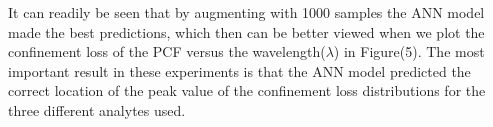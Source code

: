 \documentclass[draft, 10pt]{IEEEtran}
\begin{document}
\begin{figure}[h]
\begin{subfigure}{.5\textwidth}
\end{subfigure}
\caption{}
\end{figure}
\newpage
It can readily be seen that by augmenting with 1000 samples the ANN model made the best predictions, which then can be better viewed when we plot the confinement loss of the PCF versus the wavelength($\lambda$) in Figure(5).
The most important result in these experiments is that the ANN model predicted the correct location of the peak value of the confinement loss distributions for the three different analytes used. 
\end{document}
